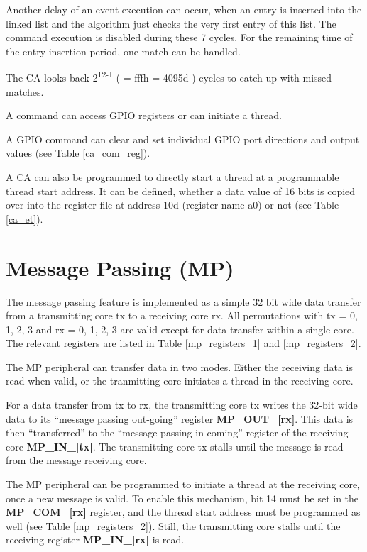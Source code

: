 Another delay of an event execution can occur, when an entry is inserted into the linked list and the algorithm just checks the very first entry of this list. The command execution is disabled during these 7 cycles. For the remaining time of the entry insertion period, one match can be handled.

The CA looks back 2\textsuperscript{12-1} ( = fffh = 4095d ) cycles to catch up with missed matches.

A command can access GPIO registers or can initiate a thread. 

A GPIO command can clear and set individual GPIO port directions and output values (see Table \ref{ca_com_reg}).

A CA can also be programmed to directly start a thread at a programmable thread start address. It can be defined, whether a data value of 16 bits is copied over into the register file at address 10d (register name a0) or not (see Table \ref{ca_et}). %

\section{Message Passing (MP)}

The message passing feature is implemented as a simple 32 bit wide data transfer from a transmitting core tx to a receiving core rx. All permutations with tx = {0, 1, 2, 3} and rx = {0, 1, 2, 3} are valid except for data transfer within a single core. The relevant registers are listed in Table \ref{mp_registers_1} and \ref{mp_registers_2}.

The MP peripheral can transfer data in two modes. Either the receiving data is read when valid, or the tranmitting core initiates a thread in the receiving core.

For a data transfer from tx to rx, the transmitting core tx writes the 32-bit wide data to its “message passing out-going” register \textbf{MP\_OUT\_[rx]}. This data is then “transferred” to the “message passing in-coming” register of the receiving core \textbf{MP\_IN\_[tx]}. The transmitting core tx stalls until the message is read from the message receiving core.

The MP peripheral can be programmed to initiate a thread at the receiving core, once a new message is valid. To enable this mechanism, bit 14 must be set in the \textbf{MP\_COM\_[rx]} register, and the thread start address must be programmed as well (see Table \ref{mp_registers_2}). Still, the transmitting core stalls until the receiving register \textbf{MP\_IN\_[rx]} is read. 

